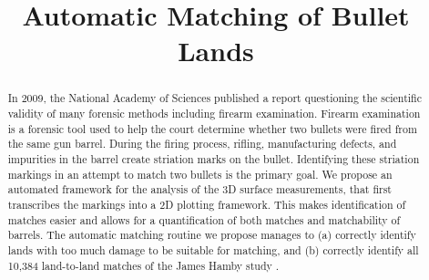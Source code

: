 \documentclass[aoas, preprint]{imsart}\usepackage[]{graphicx}\usepackage[]{color}
\begin{document}
\begin{frontmatter}

\title{Automatic Matching of Bullet Lands}

%
\begin{abstract}
In 2009, the National Academy of Sciences published a report questioning the scientific validity of many forensic methods including firearm examination. Firearm examination is a forensic tool used to help the court determine whether two bullets were fired from the same gun barrel. During the firing process, rifling, manufacturing defects, and impurities in the barrel create striation marks on the bullet. Identifying these striation markings in an attempt to match two bullets is the primary goal. We propose an automated framework for the analysis of the 3D surface measurements, that first transcribes the markings into a 2D plotting framework. This makes identification of matches easier and allows for a quantification of both matches and matchability of barrels. The automatic matching routine we propose manages to (a) correctly identify lands with too much damage to be suitable for matching, and (b) correctly identify all 10,384 land-to-land matches of the James Hamby study \citep{hamby:2009}.
\end{abstract}


\end{frontmatter}
\end{document}
